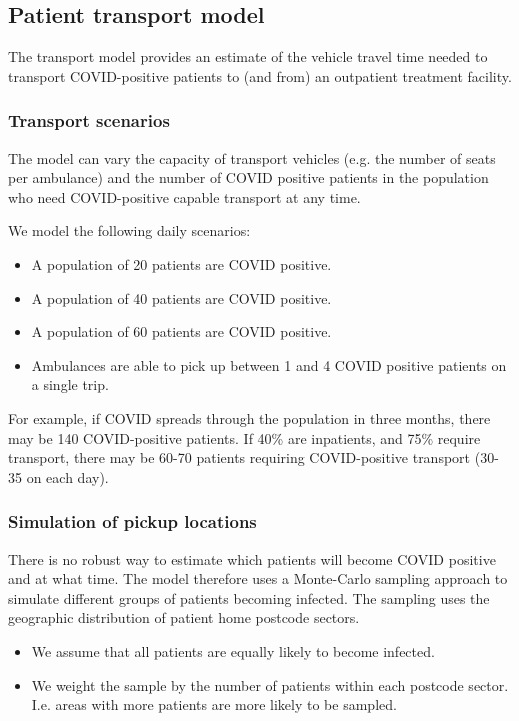 \begin{multicols}{2}

\subsection{Patient transport model}
The transport model provides an estimate of the vehicle travel time needed to transport COVID-positive patients to (and from) an outpatient treatment facility. 

\subsubsection{Transport scenarios}

The model can vary the capacity of transport vehicles (e.g. the number of seats per ambulance) and the number of COVID positive patients in the population who need COVID-positive capable transport at any time.

We model the following daily scenarios:

\begin{itemize}
    \item A population of 20 patients are COVID positive.
    \item A population of 40 patients are COVID positive.
    \item A population of 60 patients are COVID positive.
    \item Ambulances are able to pick up between 1 and 4 COVID positive patients on a single trip.
\end{itemize}

For example, if COVID spreads through the population in three months, there may be 140 COVID-positive patients. If 40\% are inpatients, and 75\% require transport, there may be 60-70 patients requiring
COVID-positive transport (30-35 on each day).

\subsubsection{Simulation of pickup locations}
There is no robust way to estimate which patients will become COVID positive and at what time. The model therefore uses a Monte-Carlo sampling approach to simulate different groups of patients becoming infected. The sampling uses the geographic distribution of patient home postcode sectors. 

\begin{itemize}
    \item We assume that all patients are equally likely to become infected.
    \item We weight the sample by the number of patients within each postcode sector.  I.e. areas with more patients are more likely to be sampled. 
\end{itemize}


\end{multicols}
